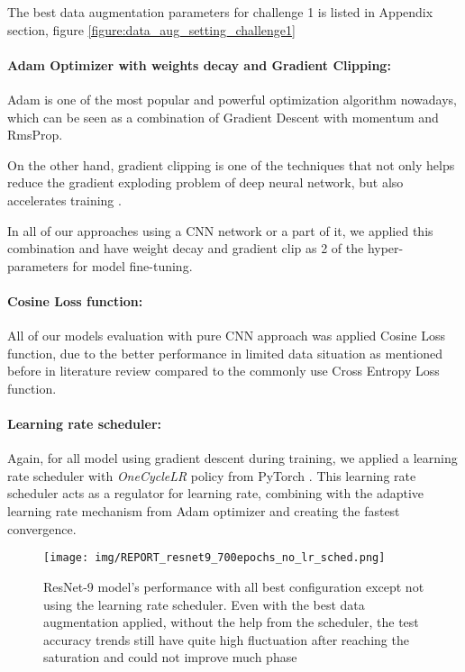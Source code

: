\documentclass[10pt,twocolumn,letterpaper]{article}
\begin{document}
The best data augmentation parameters for challenge 1 is listed in Appendix section, figure \ref{figure:data_aug_setting_challenge1}

\paragraph{Adam Optimizer with weights decay and Gradient Clipping:}
Adam \cite{kingma2017adam} is one of the most popular and powerful optimization algorithm nowadays, which can be seen as a combination of Gradient Descent with momentum and RmsProp.

On the other hand, gradient clipping \cite{zhang2020_grad_clip} is one of the techniques that not only helps reduce the gradient exploding problem of deep neural network, but also accelerates training \cite{zhang2020_grad_clip}.

In all of our approaches using a CNN network or a part of it, we applied this combination and have weight decay and gradient clip as 2 of the hyper-parameters for model fine-tuning. 
\paragraph{Cosine Loss function:}

All of our models evaluation with pure CNN approach was applied Cosine Loss function, due to the better performance in limited data situation as mentioned before in literature review \cite{cosine-loss} compared to the commonly use Cross Entropy Loss function.

\paragraph{Learning rate scheduler:}
Again, for all model using gradient descent during training, we applied a learning rate scheduler with \textit{OneCycleLR} policy from PyTorch \cite{leslie17_lr_scheduler}. This learning rate scheduler acts as a regulator for learning rate, combining with the adaptive learning rate mechanism from Adam optimizer and creating the fastest convergence.

\begin{figure}[h!]
   \centering
       \texttt{[image: img/REPORT\_resnet9\_700epochs\_no\_lr\_sched.png]}
   \caption{ResNet-9 model's performance with all best configuration except not using the learning rate scheduler. Even with the best data augmentation applied, without the help from the scheduler, the test accuracy trends still have quite high fluctuation after reaching the saturation and could not improve much phase\label{figure:challenge1_no_lr}}
\end{figure}
\end{document}
